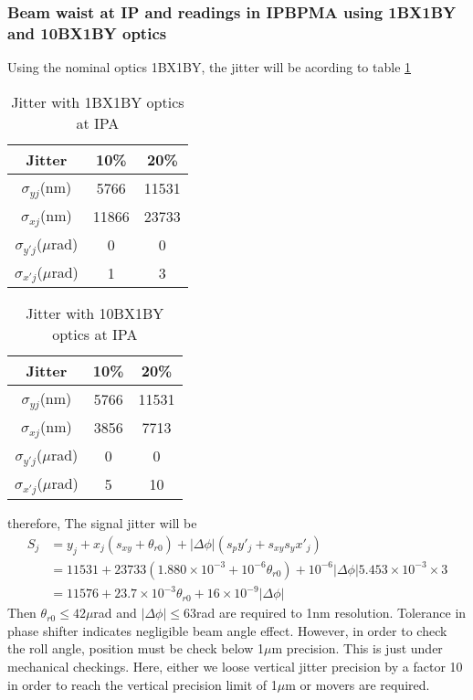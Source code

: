 \subsubsection{Beam waist at IP and readings in IPBPMA using 1BX1BY and 10BX1BY optics}
Using the nominal optics 1BX1BY, the jitter will be acording to table \ref{t-jitter1BX1BY-IPA}
\begin{table}[hbt]
\begin{center}
 \begin{tabular}{|c|c|c|}\hline
 Jitter &10\% & 20\%\\\hline
 $\sigma_{yj}$(nm) & 5766  &11531\\\hline
 $\sigma_{xj}$(nm) &11866&23733 \\\hline
 $\sigma_{y'j}$($\mu$rad) &0&0\\\hline
 $\sigma_{x'j}$($\mu$rad) &1&3\\\hline
 \end{tabular}
 \caption{Jitter with 1BX1BY optics at IPA}\label{t-jitter1BX1BY-IPA}
 \end{center}
\end{table}
\begin{table}[hbt]
\begin{center}
 \begin{tabular}{|c|c|c|}\hline
 Jitter &10\% & 20\%\\\hline
 $\sigma_{yj}$(nm) &5766&11531\\\hline
 $\sigma_{xj}$(nm) &3856&7713\\\hline
 $\sigma_{y'j}$($\mu$rad) &0&0\\\hline
 $\sigma_{x'j}$($\mu$rad) &5&10\\\hline
 \end{tabular}
 \caption{Jitter with 10BX1BY optics at IPA}\label{t-jitter10BX1BY-IPA}
 \end{center}
\end{table}
therefore, The signal jitter will be
\begin{align*}
S_j&=y_j+x_j(s_{xy}+\theta_{r0})+|\Delta\phi|(s_py'_j+s_{xy}s_yx'_j)\\
 &=11531+23733(1.880\times10^{-3}+10^{-6}\theta_{r0})+10^{-6}|\Delta\phi|5.453\times10^{-3}\times3\\
 &=11576+23.7\times10^{-3}\theta_{r0}+16\times10^{-9}|\Delta\phi|
\end{align*}
Then $\theta_{r0}\leq 42\mu$rad and $|\Delta\phi|\leq 63$rad are required to 1nm resolution. Tolerance in phase shifter indicates negligible beam angle effect. However, in order to check the roll angle, position must be check below 1$\mu$m precision. This is just  under mechanical checkings. Here, either we loose vertical jitter precision by a factor 10 in order to reach the vertical precision limit of 1$\mu$m or movers are required.\par
